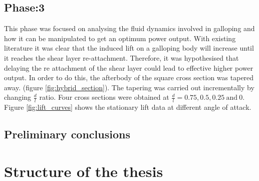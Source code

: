 \documentclass[authoryear,12pt]{article}
\begin{document}
\clearpage

\subsection{Phase:3}

This phase was focused on analysing the fluid dynamics involved in galloping and how it can be manipulated to get an optimum power output. With existing literature it was clear that the induced lift on a galloping body will increase until it reaches the shear layer re-attachment. Therefore, it was hypothesised that delaying the re attachment of the shear layer could lead to effective higher power output. In order to do this, the afterbody of the square cross section was tapered away. (figure \ref{fig:hybrid_section}). The tapering was carried out incrementally by changing $\frac{d}{l}$ ratio. Four cross sections were obtained at $\frac{d}{l}= 0.75,0.5,0.25 \ \text{and} \ 0$. Figure \ref{fig:lift_curves} shows the stationary lift data at different angle of attack. 

 \vspace{30mm}







\subsection{Preliminary conclusions}





\clearpage

\section{Structure of the thesis}
\end{document}
